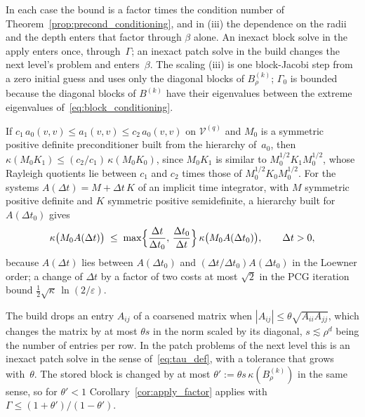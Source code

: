 \documentclass[hidelinks]{siamart}
\theoremstyle{nonumberplain}
\numberwithin{theorem}{section}
\begin{document}
In each case the bound is a factor times the condition number of
Theorem~\ref{prop:precond_conditioning}, and in (iii) the dependence on
the radii and the depth enters that factor through $\beta$ alone.  An
inexact block solve in the apply enters once, through~$\Gamma$; an
inexact patch solve in the build changes the next level's problem and
enters~$\beta$.  The scaling (iii) is one block-Jacobi step from a zero
initial guess and uses only the diagonal blocks of $B^{(k)}_\rho$;
$\Gamma_0$ is bounded because the diagonal blocks of $B^{(k)}$ have
their eigenvalues between the extreme eigenvalues
of~\eqref{eq:block_conditioning}.

If $c_1\, a_0(v,v) \leq a_1(v,v) \leq c_2\, a_0(v,v)$ on
$\mathcal{V}^{(q)}$ and $M_0$ is a symmetric positive definite
preconditioner built from the hierarchy of~$a_0$, then
$\kappa(M_0 K_1) \leq (c_2/c_1)\, \kappa(M_0 K_0)$, since $M_0 K_1$ is
similar to $M_0^{1/2} K_1 M_0^{1/2}$, whose Rayleigh quotients lie
between $c_1$ and $c_2$ times those of $M_0^{1/2} K_0 M_0^{1/2}$.  For
the systems $A(\Delta t) = M + \Delta t\, K$ of an implicit time
integrator, with $M$ symmetric positive definite and $K$ symmetric
positive semidefinite, a hierarchy built for $A(\Delta t_0)$ gives
\begin{equation}\label{eq:timestep_bound}
  \kappa\bigl(M_0 A(\Delta t)\bigr)
  \;\leq\; \max\Bigl\{ \frac{\Delta t}{\Delta t_0},\, \frac{\Delta t_0}{\Delta t} \Bigr\}\,
    \kappa\bigl(M_0 A(\Delta t_0)\bigr),
  \qquad \Delta t > 0 ,
\end{equation}
because $A(\Delta t)$ lies between $A(\Delta t_0)$ and
$(\Delta t/\Delta t_0) A(\Delta t_0)$ in the Loewner order; a change of
$\Delta t$ by a factor of two costs at most $\sqrt{2}$ in the PCG
iteration bound $\tfrac12\sqrt{\kappa}\,\ln(2/\varepsilon)$.

\begin{remark}[Thresholding]\label{rem:inexact}
The build drops an entry $A_{ij}$ of a coarsened matrix when
$|A_{ij}| \leq \theta \sqrt{A_{ii} A_{jj}}$, which changes the matrix by
at most $\theta s$ in the norm scaled by its diagonal, $s \lesssim \rho^d$
being the number of entries per row.  In the patch problems of the next
level this is an inexact patch solve in the sense of~\eqref{eq:tau_def},
with a tolerance that grows with~$\theta$.  The stored block is changed
by at most $\theta' := \theta s\, \kappa(B^{(k)}_\rho)$ in the same
sense, so for $\theta' < 1$ Corollary~\ref{cor:apply_factor} applies
with $\Gamma \leq (1+\theta')/(1-\theta')$.
\end{remark}
\end{document}
